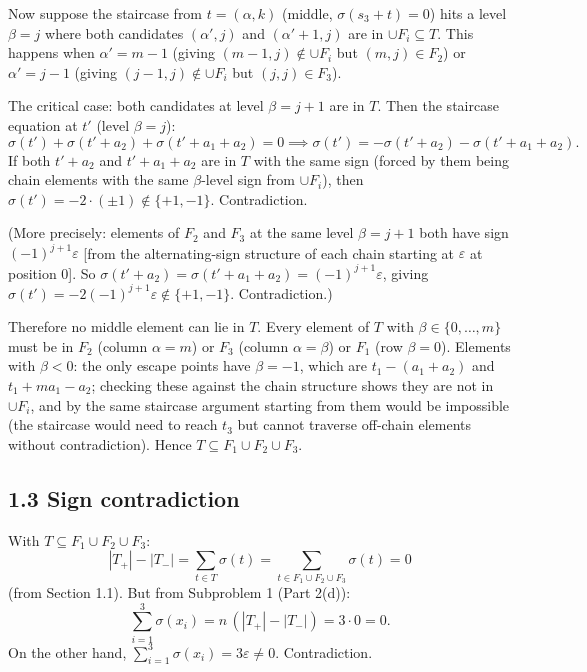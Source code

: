 Now suppose the staircase from \(t=(\alpha,k)\) (middle, \(\sigma(s_3+t)=0\)) hits a level \(\beta=j\) where both candidates \((\alpha',j)\) and \((\alpha'+1,j)\) are in \(\cup F_i\subseteq T\).  This happens when \(\alpha'=m-1\) (giving \((m-1,j)\notin \cup F_i\) but \((m,j)\in F_2\)) or \(\alpha'=j-1\) (giving \((j-1,j)\notin \cup F_i\) but \((j,j)\in F_3\)).

The critical case: both candidates at level \(\beta=j+1\) are in \(T\).  Then the staircase equation at \(t'\) (level \(\beta=j\)):
\[
  \sigma(t') + \sigma(t'+a_2) + \sigma(t'+a_1+a_2) = 0
  \implies \sigma(t') = -\sigma(t'+a_2)-\sigma(t'+a_1+a_2).
\]
If both \(t'+a_2\) and \(t'+a_1+a_2\) are in \(T\) with the same sign (forced by them being chain elements with the same \(\beta\)-level sign from \(\cup F_i\)), then \(\sigma(t')=-2\cdot(\pm 1)\notin\{+1,-1\}\).  Contradiction.

(More precisely: elements of \(F_2\) and \(F_3\) at the same level \(\beta=j+1\) both have sign \((-1)^{j+1}\varepsilon\) [from the alternating-sign structure of each chain starting at \(\varepsilon\) at position 0].  So \(\sigma(t'+a_2)=\sigma(t'+a_1+a_2)=(-1)^{j+1}\varepsilon\), giving \(\sigma(t')=-2(-1)^{j+1}\varepsilon\notin\{+1,-1\}\).  Contradiction.)

Therefore no middle element can lie in \(T\).  Every element of \(T\) with \(\beta\in\{0,\dots,m\}\) must be in \(F_2\) (column \(\alpha=m\)) or \(F_3\) (column \(\alpha=\beta\)) or \(F_1\) (row \(\beta=0\)).  Elements with \(\beta<0\): the only escape points have \(\beta=-1\), which are \(t_1-(a_1+a_2)\) and \(t_1+ma_1-a_2\); checking these against the chain structure shows they are not in \(\cup F_i\), and by the same staircase argument starting from them would be impossible (the staircase would need to reach \(t_3\) but cannot traverse off-chain elements without contradiction).  Hence \(T\subseteq F_1\cup F_2\cup F_3\).

\subsection*{1.3 Sign contradiction}

With \(T\subseteq F_1\cup F_2\cup F_3\):
\[
  |T_+|-|T_-| = \sum_{t\in T}\sigma(t) = \sum_{t\in F_1\cup F_2\cup F_3}\sigma(t) = 0
\]
(from Section 1.1).  But from Subproblem 1 (Part 2(d)):
\[
  \sum_{i=1}^3\sigma(x_i) = n\,(|T_+|-|T_-|) = 3\cdot 0 = 0.
\]
On the other hand, \(\sum_{i=1}^3\sigma(x_i)=3\varepsilon\ne 0\).  Contradiction.

